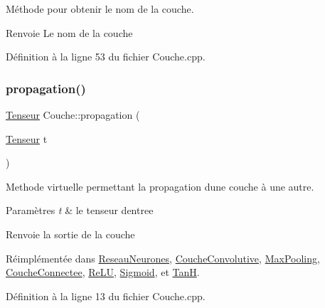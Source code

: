 Méthode pour obtenir le nom de la couche. 

\begin{DoxyReturn}{Renvoie}
Le nom de la couche 
\end{DoxyReturn}


Définition à la ligne 53 du fichier Couche.\+cpp.

\mbox{\label{class_couche_a1f0ed59e21020f5d4f37933af4d1b1e5}} 
\subsubsection{\texorpdfstring{propagation()}{propagation()}}
{\footnotesize\ttfamily \hyperlink{class_tenseur}{Tenseur} Couche\+::propagation (\begin{DoxyParamCaption}\item[{\hyperlink{class_tenseur}{Tenseur}}]{t }\end{DoxyParamCaption})\hspace{0.3cm}{\ttfamily [virtual]}}



Methode virtuelle permettant la propagation d\textquotesingle{}une couche à une autre. 


\begin{DoxyParams}{Paramètres}
{\em t} & le tenseur d\textquotesingle{}entree \\
\hline
\end{DoxyParams}
\begin{DoxyReturn}{Renvoie}
la sortie de la couche 
\end{DoxyReturn}


Réimplémentée dans \hyperlink{class_reseau_neurones_a7079f7694f0369187b8ff28cefcbc5eb}{Reseau\+Neurones}, \hyperlink{class_couche_convolutive_ad1a55b3dc9bf52e0725ae2a7b2e92aa1}{Couche\+Convolutive}, \hyperlink{class_max_pooling_a48e0258bf1f949853cfceb2726035fb8}{Max\+Pooling}, \hyperlink{class_couche_connectee_acd60c499c6c74f914795f45f3f8084d0}{Couche\+Connectee}, \hyperlink{class_re_l_u_a0d42917d6a9124571b0b467c81bce38a}{Re\+LU}, \hyperlink{class_sigmoid_a6bd1f6bbc49bd7e634dc33701aee420c}{Sigmoid}, et \hyperlink{class_tan_h_a869967c9b278c6592e6fcc04b61a5f0c}{TanH}.



Définition à la ligne 13 du fichier Couche.\+cpp.

\mbox{\label{class_couche_ab24ce01bc6fb7b903013f7682ce60a7e}} 
